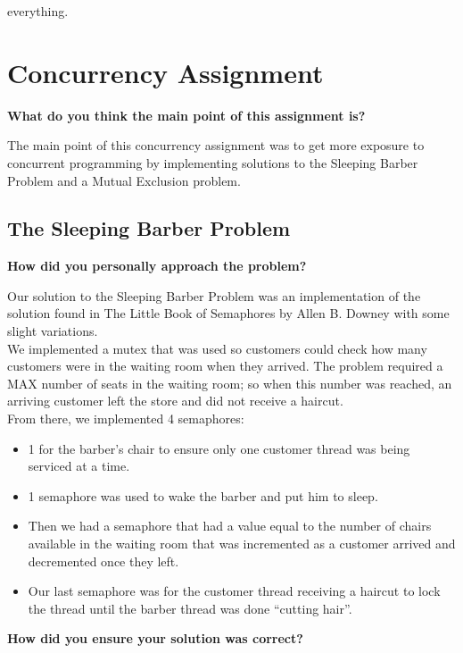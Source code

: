 \documentclass[10pt,letterpaper,draftclsnofoot,onecolumn]{IEEEtran}
\begin{document}
\noindent everything.

\section{Concurrency Assignment}
\bigskip

\noindent\textbf{What do you think the main point of this assignment is?}
\medskip

\medskip

\noindent The main point of this concurrency assignment was to get more exposure to concurrent programming by implementing solutions to the Sleeping Barber Problem and a Mutual Exclusion problem. 

\bigskip

\subsection{The Sleeping Barber Problem}
\noindent\textbf{How did you personally approach the problem?}
\medskip

\medskip

\noindent Our solution to the Sleeping Barber Problem was an implementation of the solution found in The Little Book of Semaphores by Allen B. Downey with some slight variations.\\
We implemented a mutex that was used so customers could check how many customers were in the waiting room when they arrived. The problem required a MAX number of seats in the waiting room; so when this number was reached, an arriving customer left the store and did not receive a haircut.\\
From there, we implemented 4 semaphores:
\begin{itemize}
\item 1 for the barber's chair to ensure only one customer thread was being serviced at a time.
\item 1 semaphore was used to wake the barber and put him to sleep.
\item Then we had a semaphore that had a value equal to the number of chairs available in the waiting room that was incremented as a customer arrived and decremented once they left.
\item Our last semaphore was for the customer thread receiving a haircut to lock the thread until the barber thread was done ``cutting hair''.
\end{itemize}

\bigskip

\noindent\textbf{How did you ensure your solution was correct?}
\medskip
\end{document}
